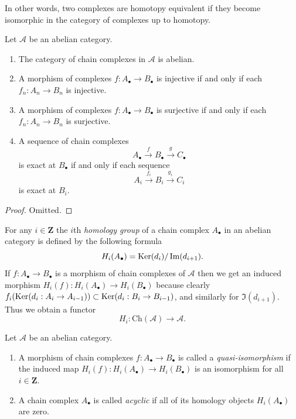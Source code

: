 \noindent
In other words, two complexes are homotopy
equivalent if they become
isomorphic in the category of complexes up to
homotopy.

\begin{lemma}
\label{lemma-cat-chain-abelian}
Let $\mathcal{A}$ be an abelian category.
\begin{enumerate}
\item The category of chain complexes in
$\mathcal{A}$ is
abelian.
\item A morphism of complexes
$f : A_\bullet \to B_\bullet$ is injective
if and only if each $f_n : A_n \to B_n$ is
injective.
\item A morphism of complexes
$f : A_\bullet \to B_\bullet$ is surjective
if and only if each $f_n : A_n \to B_n$ is
surjective.
\item A sequence of chain complexes
$$
A_\bullet \xrightarrow{f} B_\bullet
\xrightarrow{g} C_\bullet
$$
is exact at $B_\bullet$ if and only if each
sequence
$$
A_i \xrightarrow{f_i} B_i \xrightarrow{g_i}
C_i
$$
is exact at $B_i$.
\end{enumerate}
\end{lemma}

\begin{proof}
Omitted.
\end{proof}

\noindent
For any $i \in \mathbf{Z}$ the $i$th {\it
homology group}
of a chain complex $A_\bullet$ in an abelian
category is defined by
the following formula
$$
H_i(A_\bullet) = \mathop{\mathrm{Ker}}(d_i)/\mathop{\mathrm{Im}}(d_{i + 1}).
$$
If $f : A_\bullet \to B_\bullet$ is a
morphism of chain
complexes of $\mathcal{A}$ then we get an
induced
morphism $H_i(f) : H_i(A_\bullet) \to
H_i(B_\bullet)$
because clearly
$f_i(\mathop{\mathrm{Ker}}(d_i : A_i \to A_{i - 1})) \subset
\mathop{\mathrm{Ker}}(d_i : B_i \to B_{i - 1})$, and similarly
for $\Im(d_{i + 1})$.
Thus we obtain a functor
$$
H_i : \text{Ch}(\mathcal{A}) \longrightarrow
\mathcal{A}.
$$

\begin{definition}
\label{definition-quasi-isomorphism}
Let $\mathcal{A}$ be an abelian category.
\begin{enumerate}
\item A morphism of chain complexes $f :
A_\bullet \to B_\bullet$
is called a {\it quasi-isomorphism} if the
induced
map $H_i(f) : H_i(A_\bullet) \to
H_i(B_\bullet)$
is an isomorphism for all $i \in \mathbf{Z}$.
\item A chain complex $A_\bullet$ is called
{\it acyclic} if all of its homology objects
$H_i(A_\bullet)$ are zero.
\end{enumerate}
\end{definition}


